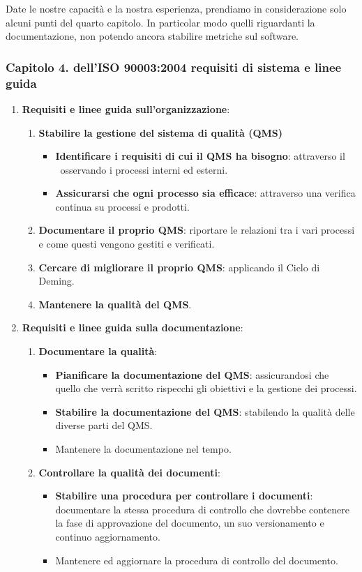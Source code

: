 	Date le nostre capacità e la nostra esperienza, prendiamo in considerazione solo alcuni punti del quarto capitolo. In particolar modo quelli riguardanti la documentazione, non potendo ancora stabilire metriche sul software.

	\subsubsection{Capitolo 4. dell'ISO 90003:2004 requisiti di sistema e linee guida}

	\begin{enumerate}
		\item \textbf{Requisiti e linee guida sull'organizzazione}:
		\begin{enumerate}
			\item \textbf{Stabilire la gestione del sistema di qualità (QMS)}
			\begin{itemize}
				\item \textbf{Identificare i requisiti di cui il QMS ha bisogno}: attraverso il \PdQ~osservando i processi interni ed esterni.
				\item \textbf{Assicurarsi che ogni processo sia efficace}: attraverso una verifica continua su processi e prodotti.
			\end{itemize}
			\item \textbf{Documentare il proprio QMS}: riportare le relazioni tra i vari processi e come questi vengono gestiti e verificati.
			\item \textbf{Cercare di migliorare il proprio QMS}: applicando il Ciclo di Deming.
			\item \textbf{Mantenere la qualità del QMS}.
		\end{enumerate}
		\newpage
		\item \textbf{Requisiti e linee guida sulla documentazione}:
		\begin{enumerate}
			\item \textbf{Documentare la qualità}:
			\begin{itemize}
				\item \textbf{Pianificare la documentazione del QMS}: assicurandosi che quello che verrà scritto rispecchi gli obiettivi e la gestione dei processi.
				\item \textbf{Stabilire la documentazione del QMS}: stabilendo la qualità delle diverse parti del QMS.
				\item Mantenere la documentazione nel tempo.
			\end{itemize}

			\item \textbf{Controllare la qualità dei documenti}:
			\begin{itemize}
				\item \textbf{Stabilire una procedura per controllare i documenti}: documentare la stessa procedura di controllo che dovrebbe contenere la fase di approvazione del documento, un suo versionamento e continuo aggiornamento.
				\item Mantenere ed aggiornare la procedura di controllo del documento.
			\end{itemize}
		\end{enumerate}
	\end{enumerate}

